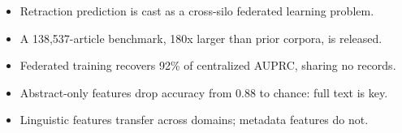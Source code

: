 \begin{itemize}
\item Retraction prediction is cast as a cross-silo federated learning problem.
\item A 138,537-article benchmark, 180x larger than prior corpora, is released.
\item Federated training recovers 92\% of centralized AUPRC, sharing no records.
\item Abstract-only features drop accuracy from 0.88 to chance: full text is key.
\item Linguistic features transfer across domains; metadata features do not.
\end{itemize}
